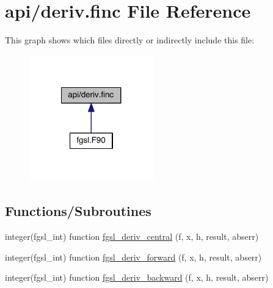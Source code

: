 \hypertarget{deriv_8finc}{\section{api/deriv.finc File Reference}
\label{deriv_8finc}
}
This graph shows which files directly or indirectly include this file\-:
\nopagebreak
\begin{figure}[H]
\begin{center}
\leavevmode
\includegraphics[width=152pt]{deriv_8finc__dep__incl}
\end{center}
\end{figure}
\subsection*{Functions/\-Subroutines}
\begin{DoxyCompactItemize}
\item 
integer(fgsl\-\_\-int) function \hyperlink{deriv_8finc_ac8be2c24bb08d1a46d9b9f941c2f8221}{fgsl\-\_\-deriv\-\_\-central} (f, x, h, result, abserr)
\item 
integer(fgsl\-\_\-int) function \hyperlink{deriv_8finc_ae36c355d73cf6e494e5bf2ce531ff400}{fgsl\-\_\-deriv\-\_\-forward} (f, x, h, result, abserr)
\item 
integer(fgsl\-\_\-int) function \hyperlink{deriv_8finc_ace2b5daaf357f4504c73ebb5f1be2864}{fgsl\-\_\-deriv\-\_\-backward} (f, x, h, result, abserr)
\end{DoxyCompactItemize}


